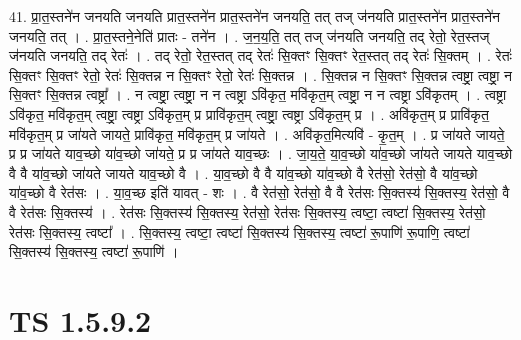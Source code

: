 \documentclass[17pt]{extarticle}
\begin{document}
41. प्रा॒त॒स्तने॑न जनयति जनयति प्रात॒स्तने॑न प्रात॒स्तने॑न जनयति॒ तत् तज् ज॑नयति प्रात॒स्तने॑न प्रात॒स्तने॑न जनयति॒ तत् । . प्रा॒त॒स्तने॒नेति॑ प्रातः - तने॑न । . ज॒न॒य॒ति॒ तत् तज् ज॑नयति जनयति॒ तद् रेतो॒ रेत॒स्तज् ज॑नयति जनयति॒ तद् रेतः॑ । . तद् रेतो॒ रेत॒स्तत् तद् रेतः॑ सि॒क्तꣳ सि॒क्तꣳ रेत॒स्तत् तद् रेतः॑ सि॒क्तम् । . रेतः॑ सि॒क्तꣳ सि॒क्तꣳ रेतो॒ रेतः॑ सि॒क्तन्न न सि॒क्तꣳ रेतो॒ रेतः॑ सि॒क्तन्न । . सि॒क्तन्न न सि॒क्तꣳ सि॒क्तन्न त्वष्ट्रा॒ त्वष्ट्रा॒ न सि॒क्तꣳ सि॒क्तन्न त्वष्ट्रा᳚ । . न त्वष्ट्रा॒ त्वष्ट्रा॒ न न त्वष्ट्रा ऽवि॑कृत॒ मवि॑कृत॒म् त्वष्ट्रा॒ न न त्वष्ट्रा ऽवि॑कृतम् । . त्वष्ट्रा ऽवि॑कृत॒ मवि॑कृत॒म् त्वष्ट्रा॒ त्वष्ट्रा ऽवि॑कृत॒म् प्र प्रावि॑कृत॒म् त्वष्ट्रा॒ त्वष्ट्रा ऽवि॑कृत॒म् प्र । . अवि॑कृत॒म् प्र प्रावि॑कृत॒ मवि॑कृत॒म् प्र जा॑यते जायते॒ प्रावि॑कृत॒ मवि॑कृत॒म् प्र जा॑यते । . अवि॑कृत॒मित्यवि॑ - कृ॒त॒म् । . प्र जा॑यते जायते॒ प्र प्र जा॑यते याव॒च्छो या॑व॒च्छो जा॑यते॒ प्र प्र जा॑यते याव॒च्छः । . जा॒य॒ते॒ या॒व॒च्छो या॑व॒च्छो जा॑यते जायते याव॒च्छो वै वै या॑व॒च्छो जा॑यते जायते याव॒च्छो वै । . या॒व॒च्छो वै वै या॑व॒च्छो या॑व॒च्छो वै रेत॑सो॒ रेत॑सो॒ वै या॑व॒च्छो या॑व॒च्छो वै रेत॑सः । . या॒व॒च्छ इति॑ यावत् - शः । . वै रेत॑सो॒ रेत॑सो॒ वै वै रेत॑सः सि॒क्तस्य॑ सि॒क्तस्य॒ रेत॑सो॒ वै वै रेत॑सः सि॒क्तस्य॑ । . रेत॑सः सि॒क्तस्य॑ सि॒क्तस्य॒ रेत॑सो॒ रेत॑सः सि॒क्तस्य॒ त्वष्टा॒ त्वष्टा॑ सि॒क्तस्य॒ रेत॑सो॒ रेत॑सः सि॒क्तस्य॒ त्वष्टा᳚ । . सि॒क्तस्य॒ त्वष्टा॒ त्वष्टा॑ सि॒क्तस्य॑ सि॒क्तस्य॒ त्वष्टा॑ रू॒पाणि॑ रू॒पाणि॒ त्वष्टा॑ सि॒क्तस्य॑ सि॒क्तस्य॒ त्वष्टा॑ रू॒पाणि॑ । \newline
\pagebreak
{}

\section{ TS 1.5.9.2 }
\end{document}
